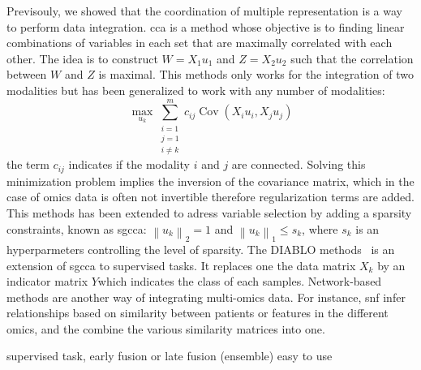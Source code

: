 \documentclass[../main.tex]{subfiles}
\begin{document}
		Previsouly, we showed that the coordination of multiple representation is a way to perform data integration.
		\Gls{cca} is a method whose objective is to finding linear combinations of variables in each set that are maximally correlated with each other.
		The idea is to construct \(W=X_1u_1\) and \(Z=X_2u_2\) such that the correlation between \(W\) and \(Z\) is maximal.
		This methods only works for the integration of two modalities but has been generalized to work with any number of modalities:
		\begin{equation}
			\max_{u_k} \sum_{\substack{i=1 \\ j=1 \\ i\neq k}}^{m} c_{ij}\operatorname{Cov}\left(X_iu_i,X_ju_j\right)
		\end{equation}
		the term \(c_{ij}\) indicates if the modality \(i\) and \(j\) are connected.
		Solving this minimization problem implies the inversion of the covariance matrix, which in the case of omics data is often not invertible therefore regularization terms are added.
		This methods has been extended to adress variable selection by adding a sparsity constraints, known as \gls{sgcca}: \({\left\|u_k \right\|}_2 = 1\) and \({\left\|u_k \right\|}_1 \leq s_k\), where \(s_k\) is an hyperparmeters controlling the level of sparsity.
		The DIABLO methods~\cite{DIABLO} is an extension of \gls{sgcca} to supervised tasks.
		It replaces one the data matrix \(X_k\) by an indicator matrix \(Y\)which indicates the class of each samples.
		Network-based methods are another way of integrating multi-omics data.
		For instance, \gls{snf} infer relationships based on similarity between patients or features in the different omics, and the combine the various similarity matrices into one.

		supervised task, early fusion or late fusion (ensemble) easy to use

\end{document}
